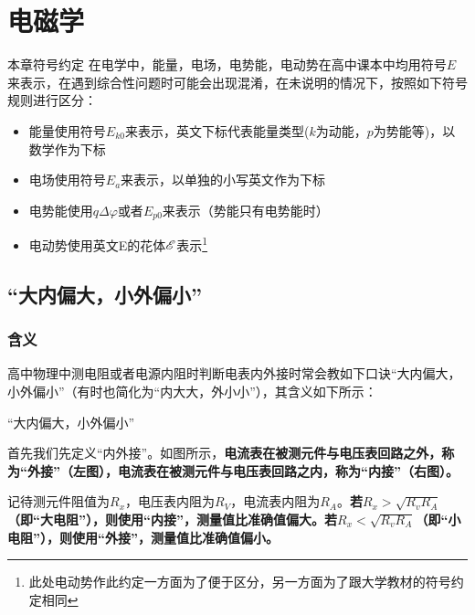 
\chapter{电磁学}

\begin{mk}{本章符号约定}{}
在电学中，能量，电场，电势能，电动势在高中课本中均用符号$E$来表示，在遇到综合性问题时可能会出现混淆，在未说明的情况下，按照如下符号规则进行区分：

\begin{itemize}
\item 能量使用符号$E_{k0}$来表示，英文下标代表能量类型($k$为动能，$p$为势能等)，以数学作为下标
\item 电场使用符号$E_a$来表示，以单独的小写英文作为下标
\item 电势能使用$q \Delta \varphi$或者$E_{p0}$来表示（势能只有电势能时）
\item 电动势使用英文E的花体$\mathscr{E}$表示\footnote{此处电动势作此约定一方面为了便于区分，另一方面为了跟大学教材的符号约定相同}
\end{itemize}
\end{mk}

\section{“大内偏大，小外偏小”}

\subsection{含义}
高中物理中测电阻或者电源内阻时判断电表内外接时常会教如下口诀“大内偏大，小外偏小”（有时也简化为“内大大，外小小”），其含义如下所示：

\begin{theo}{“大内偏大，小外偏小”}{}



首先我们先定义“内外接”。如图所示，\textbf{电流表在被测元件与电压表回路之外，称为“外接”（左图），电流表在被测元件与电压表回路之内，称为“内接”（右图）。}

记待测元件阻值为$R_x$，电压表内阻为$R_V$，电流表内阻为$R_A$。\textbf{若$R_x > \sqrt{R_v R_A}$（即“大电阻”），则使用“内接”，测量值比准确值偏大。若$R_x < \sqrt{R_v R_A}$（即“小电阻”），则使用“外接”，测量值比准确值偏小。}

\end{theo}

